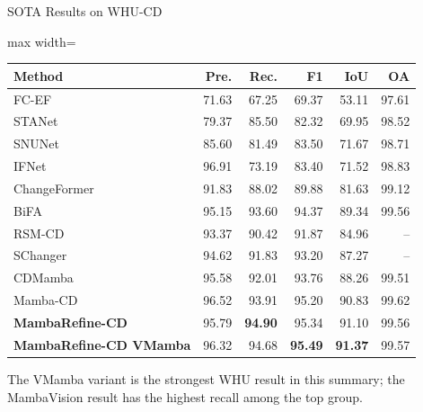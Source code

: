 \begin{frame}{SOTA Results on WHU-CD}
    \centering
    \scriptsize
    \begin{adjustbox}{max width=\textwidth}
    \begin{tabular}{lrrrrr}
        \toprule
        \textbf{Method} & \textbf{Pre.} & \textbf{Rec.} & \textbf{F1} & \textbf{IoU} & \textbf{OA} \\
        \midrule
        FC-EF & 71.63 & 67.25 & 69.37 & 53.11 & 97.61 \\
        STANet & 79.37 & 85.50 & 82.32 & 69.95 & 98.52 \\
        SNUNet & 85.60 & 81.49 & 83.50 & 71.67 & 98.71 \\
        IFNet & 96.91 & 73.19 & 83.40 & 71.52 & 98.83 \\
        ChangeFormer & 91.83 & 88.02 & 89.88 & 81.63 & 99.12 \\
        BiFA & 95.15 & 93.60 & 94.37 & 89.34 & 99.56 \\
        RSM-CD & 93.37 & 90.42 & 91.87 & 84.96 & -- \\
        SChanger & 94.62 & 91.83 & 93.20 & 87.27 & -- \\
        CDMamba & 95.58 & 92.01 & 93.76 & 88.26 & 99.51 \\
        Mamba-CD & 96.52 & 93.91 & 95.20 & 90.83 & 99.62 \\
        \textbf{MambaRefine-CD} & 95.79 & \textbf{94.90} & 95.34 & 91.10 & 99.56 \\
        \textbf{MambaRefine-CD VMamba} & 96.32 & 94.68 & \textbf{95.49} & \textbf{91.37} & 99.57 \\
        \bottomrule
    \end{tabular}
    \end{adjustbox}

    \vspace{0.6em}
    \small
    The VMamba variant is the strongest WHU result in this summary; the MambaVision result has the highest recall among the top group.
\end{frame}

